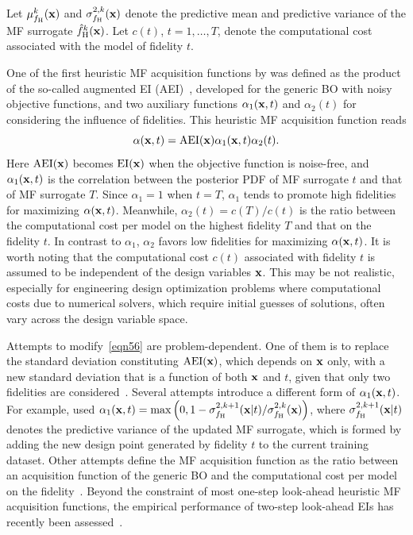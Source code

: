 \documentclass[journal ]{new-aiaa}
\begin{document}
Let $\mu^k_{f_\text{H}}(\bf x)$ and $\sigma_{f_\text{H}}^{2,k}(\bf x)$ denote the predictive mean and predictive variance of the MF surrogate $\hat{f}_\text{H}^k(\bf x)$.
Let $c(t)$, $t=1,\dots,T$, denote the computational cost associated with the model of fidelity $t$.

One of the first heuristic MF acquisition functions by \citet{Huang2006smo} was defined as the product of the so-called augmented EI (AEI)~\citep{Huang2006jgo}, developed for the generic BO with noisy objective functions, and two auxiliary functions $\alpha_1({\bf x},t)$ and $\alpha_2(t)$ for considering the influence of fidelities.
This heuristic MF acquisition function reads
\begin{equation}\label{eqn56}
	\alpha({\bf x},t) = \text{AEI}({\bf x}) \alpha_1({\bf x},t) \alpha_2(t).
\end{equation}
Here $\text{AEI}({\bf x})$ becomes $\text{EI}({\bf x})$ when the objective function is noise-free, and $\alpha_1({\bf x},t)$ is the correlation between the posterior PDF of MF surrogate $t$ and that of MF surrogate $T$.
Since $\alpha_1 = 1$ when $t=T$, $\alpha_1$ tends to promote high fidelities for maximizing $\alpha({\bf x},t)$. 
Meanwhile, $\alpha_2(t) = c(T)/c(t)$ is the ratio between the computational cost per model on the highest fidelity $T$ and that on the fidelity $t$.
In contrast to $\alpha_1$, $\alpha_2$ favors low fidelities for maximizing $\alpha({\bf x},t)$.
It is worth noting that the computational cost $c(t)$ associated with fidelity $t$ is assumed to be independent of the design variables ${\bf x}$.
This may be not realistic, especially for engineering design optimization problems where computational costs due to numerical solvers, which require initial guesses of solutions, often vary across the design variable space. 

Attempts to modify~\cref{eqn56} are problem-dependent.
One of them is to replace the standard deviation constituting $\text{AEI}({\bf x})$, which depends on ${\bf x}$ only, with a new standard deviation that is a function of both ${\bf x}$ and $t$, given that only two fidelities are considered~\citep{ZhangY2018,Ruan2020}.
Several attempts introduce a different form of $\alpha_1({\bf x},t)$.
For example, \citet{Sacher2021} used $\alpha_1({\bf x},t) = \max\left(0,1-\sigma_{f_\text{H}}^{2,k+1}({\bf x}|t)/\sigma_{f_\text{H}}^{2,k}({\bf x})\right)$, where $\sigma_{f_\text{H}}^{2,k+1}({\bf x}|t)$ denotes the predictive variance of the updated MF surrogate, which is formed by adding the new design point generated by fidelity $t$ to the current training dataset.  
Other attempts define the MF acquisition function as the ratio between an acquisition function of the generic BO and the computational cost per model on the fidelity~\citep{Winter2023,Foumani2023}.
Beyond the constraint of most one-step look-ahead heuristic MF acquisition functions, the empirical performance of two-step look-ahead EIs has recently been assessed~\citep{Ghoreishi2019,Fiore2023}.
\end{document}
